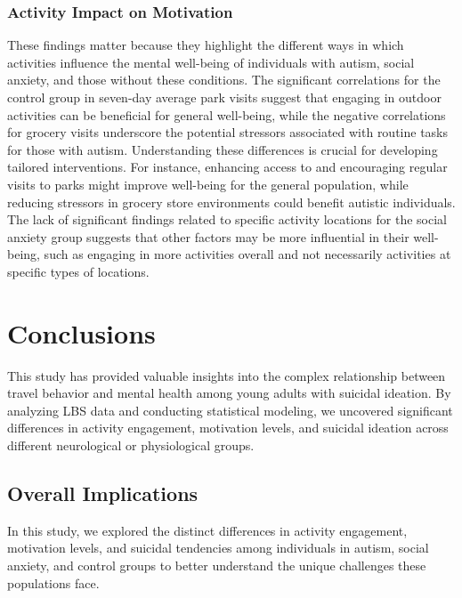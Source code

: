 \documentclass[
  letterpaper,
  number,
  review,
  3p]{elsarticle}
\begin{document}
\subsubsection{Activity Impact on
Motivation}\label{activity-impact-on-motivation}

These findings matter because they highlight the different ways in which
activities influence the mental well-being of individuals with autism,
social anxiety, and those without these conditions. The significant
correlations for the control group in seven-day average park visits
suggest that engaging in outdoor activities can be beneficial for
general well-being, while the negative correlations for grocery visits
underscore the potential stressors associated with routine tasks for
those with autism. Understanding these differences is crucial for
developing tailored interventions. For instance, enhancing access to and
encouraging regular visits to parks might improve well-being for the
general population, while reducing stressors in grocery store
environments could benefit autistic individuals. The lack of significant
findings related to specific activity locations for the social anxiety
group suggests that other factors may be more influential in their
well-being, such as engaging in more activities overall and not
necessarily activities at specific types of locations.


\section{Conclusions}\label{conclusions}

This study has provided valuable insights into the complex relationship
between travel behavior and mental health among young adults with
suicidal ideation. By analyzing LBS data and conducting statistical
modeling, we uncovered significant differences in activity engagement,
motivation levels, and suicidal ideation across different neurological
or physiological groups.

\subsection{Overall Implications}\label{overall-implications}

In this study, we explored the distinct differences in activity
engagement, motivation levels, and suicidal tendencies among individuals
in autism, social anxiety, and control groups to better understand the
unique challenges these populations face.
\end{document}
